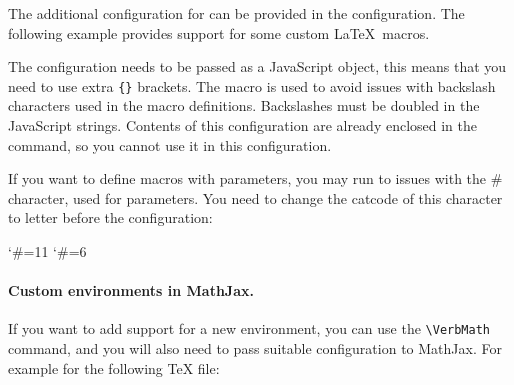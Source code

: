 The additional configuration for  can be provided in the
 configuration.
The following example provides support for some custom \LaTeX\ macros.

\begin{texsource}

\EndPreamble

\end{texsource}


The configuration needs to be passed as a JavaScript object, this means that
you need to use extra \verb|{}| brackets.
The \texcommand{\detokenize} macro is used to avoid issues with backslash
characters used in the macro definitions. Backslashes must be doubled in the
JavaScript strings. Contents of this configuration are already enclosed in the
\texcommand{\HCode} command, so you cannot use it in this configuration.

If you want to define macros with parameters, you may run to issues with the \# character, used for parameters.
You need to change the catcode of this character to letter before the  configuration:

\begin{texsource}
\catcode`\#=11
\catcode`\#=6

\EndPreamble
\end{texsource}

\paragraph{Custom environments in MathJax.}\label{sec:mathjax_env}

If you want to add support for a new environment, you can use the \verb|\VerbMath| command, and you will
also need to pass suitable configuration to MathJax. For example for the following TeX file:

